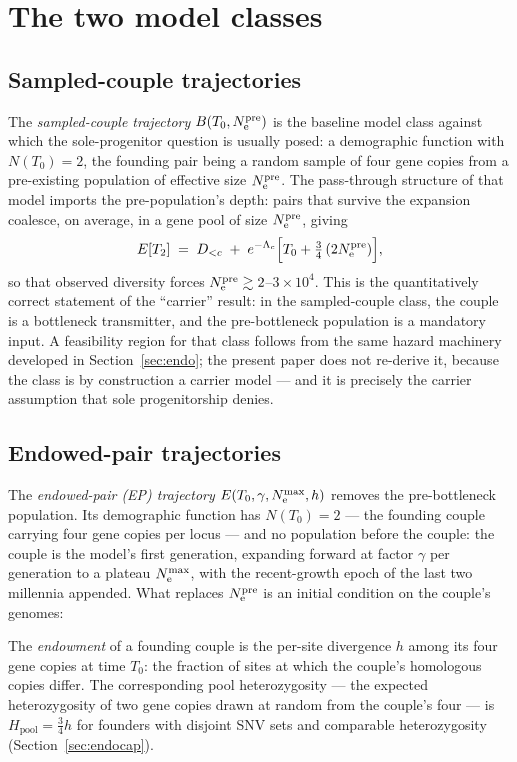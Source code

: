 \section{The two model classes}\label{sec:classes}

\subsection{Sampled-couple trajectories}
The \emph{sampled-couple trajectory} $B(T_0, N_{\mathrm{e}}^{\mathrm{pre}})$ is the baseline model
class against which the sole-progenitor question is usually posed: a
demographic function with $N(T_0) = 2$, the
founding pair being a random sample of four gene copies from a pre-existing
population of effective size $N_{\mathrm{e}}^{\mathrm{pre}}$. The pass-through structure of that
model imports the pre-population's depth: pairs that survive the expansion
coalesce, on average, in a gene pool of size $N_{\mathrm{e}}^{\mathrm{pre}}$, giving
\begin{equation}\label{eq:sampled}
E[T_2] \;=\; D_{<c} \;+\; e^{-\Lambda_c}\Big[T_0 + \tfrac{3}{4}\,(2N_{\mathrm{e}}^{\mathrm{pre}})\Big],
\end{equation}
so that observed diversity forces $N_{\mathrm{e}}^{\mathrm{pre}} \gtrsim 2$--$3\times10^4$. This
is the quantitatively correct statement of the ``carrier'' result: in the
sampled-couple class, the couple is a bottleneck transmitter, and the
pre-bottleneck population is a mandatory input. A feasibility region for
that class follows from the same hazard machinery developed in
Section~\ref{sec:endo}; the present paper does not re-derive it, because the
class is by construction a carrier model --- and it is precisely the
carrier assumption that sole progenitorship denies.

\subsection{Endowed-pair trajectories}
The \emph{endowed-pair (EP) trajectory} $E(T_0, \gamma, N_{\mathrm{e}}^{\max}, h)$
removes the pre-bottleneck population. Its demographic function has
$N(T_0) = 2$ --- the founding couple carrying four gene copies per locus ---
and no population before the couple: the couple is the model's first
generation, expanding forward at factor $\gamma$ per generation to a
plateau $N_{\mathrm{e}}^{\max}$, with the recent-growth epoch of the last two
millennia appended. What replaces $N_{\mathrm{e}}^{\mathrm{pre}}$ is an
initial condition on the couple's genomes:

\begin{definition}[Endowment]\label{def:endowment}
The \emph{endowment} of a founding couple is the per-site divergence $h$
among its four gene copies at time $T_0$: the fraction of sites at which
the couple's homologous copies differ. The corresponding pool heterozygosity
--- the expected heterozygosity of two gene copies drawn at random from the
couple's four --- is $H_{\mathrm{pool}} = \tfrac{3}{4}h$ for founders with
disjoint SNV sets and comparable heterozygosity (Section~\ref{sec:endocap}).
\end{definition}

